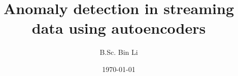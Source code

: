 \documentclass[a4paper,twoside,11pt]{book}
\title{Anomaly detection in streaming data using autoencoders}
\author{B.Sc. Bin Li}
\date{\today}
\renewcommand{\headrulewidth}{0pt}
\begin{document}
\frontmatter

\fancyfoot[C]{\thepage}

\tableofcontents

\makeatletter
\@openrightfalse
\makeatother

\listoffigures

\listoftables

\renewcommand*{\lstlistlistingname}{Codeverzeichniss}
\lstlistoflistings


\mainmatter
\renewcommand{\headrulewidth}{0.4pt}

\makeatletter
\@openrighttrue
\makeatother









\appendix



\end{document}
